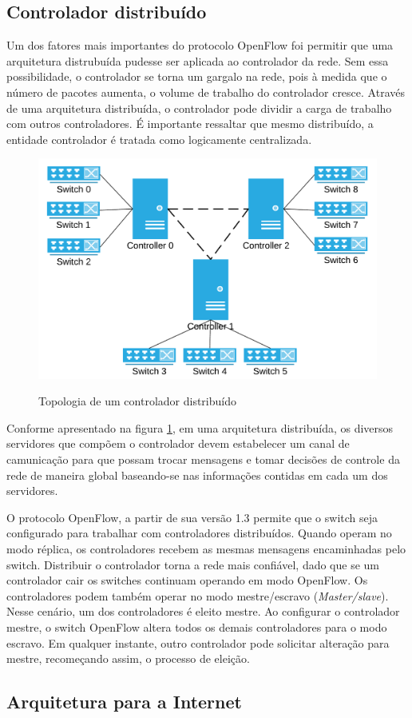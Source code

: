 \subsection{Controlador distribuído}

Um dos fatores mais importantes do protocolo OpenFlow foi permitir que 
uma arquitetura distrubuída pudesse ser aplicada ao controlador da rede.
Sem essa possibilidade, o controlador se torna um gargalo na rede, 
pois à medida que o número de pacotes aumenta, o volume de trabalho do 
controlador cresce. 
Através de uma arquitetura distribuída, o controlador pode dividir a carga 
de trabalho com outros controladores.
É importante ressaltar que mesmo distribuído, a entidade controlador
é tratada como logicamente centralizada.

\begin{figure}[h!]
    \centering
    \includegraphics{img/distributed-controller}
    \label{fig:distributed-controller}
    \caption{Topologia de um controlador distribuído}
\end{figure}

Conforme apresentado na figura \ref{fig:distributed-controller}, em uma
arquitetura distribuída, os diversos servidores que compõem o controlador
devem estabelecer um canal de camunicação para que possam trocar mensagens
e tomar decisões de controle da rede de maneira global baseando-se nas
informações contidas em cada um dos servidores.

O protocolo OpenFlow, a partir de sua versão 1.3 permite que o switch seja 
configurado para trabalhar com controladores distribuídos.
Quando operam no modo réplica, os controladores recebem as mesmas mensagens
encaminhadas pelo switch.
Distribuir o controlador torna a rede mais confiável, dado que se um 
controlador cair os switches continuam operando em modo OpenFlow.
Os controladores podem também operar no modo mestre/escravo 
(\emph{Master/slave}).
Nesse cenário, um dos controladores é eleito mestre. 
Ao configurar o controlador mestre, o switch OpenFlow altera todos os demais
controladores para o modo escravo. 
Em qualquer instante, outro controlador pode solicitar alteração para 
mestre, recomeçando assim, o processo de eleição.


\subsection{Arquitetura para a Internet}
